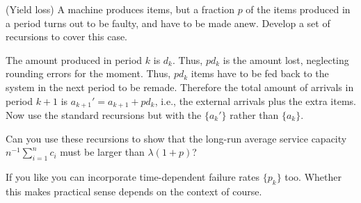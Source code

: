 \begin{exercise}
  (Yield loss) A machine produces items, but a fraction $p$ of the
  items produced in a period turns out to be faulty, and have to be
  made anew. Develop a set of recursions to cover this case.
  \begin{solution}
    The amount produced in period $k$ is $d_k$. Thus, $p d_k$ is the
    amount lost, neglecting rounding errors for the moment. Thus,
    $p d_k$ items have to be fed back to the system in the next period
    to be remade. Therefore the total amount of arrivals in period
    $k+1$ is $a_{k+1}'=a_{k+1}+pd_k$, i.e., the external arrivals plus
    the extra items. Now use the standard recursions but with the
    $\{a_{k}'\}$ rather than $\{a_k\}$.

    Can you use these recursions to show that the long-run average
    service capacity $n^{-1}\sum_{i=1}^n c_i$ must be larger than
    $\lambda(1+p)$?

    If you like you can incorporate time-dependent failure rates
    $\{p_k\}$ too. Whether this makes practical sense depends on the
    context of course.
      \end{solution}
\end{exercise}

